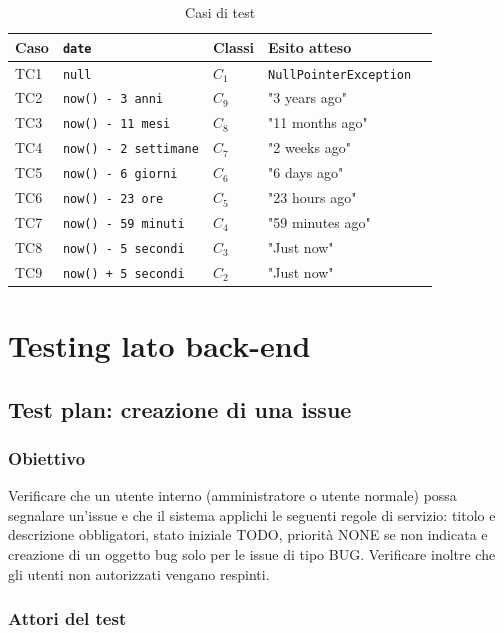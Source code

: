 \begin{table}[ht]
  \centering
  \small
  \caption{Casi di test}
  \label{tab:test-selecttogglefilter}
  \begin{tabular}{@{}llllp{4cm}@{}}
    \toprule
    Caso & \texttt{date} & Classi & Esito atteso \\
    \midrule
    TC1 & \texttt{null} & $C_1$ & \texttt{NullPointerException}  \\
    TC2 & \texttt{now() - 3 anni} & $C_9$ & "3 years ago" \\
    TC3 & \texttt{now() - 11 mesi}    & $C_8$ & "11 months ago" \\
    TC4 & \texttt{now() - 2 settimane}    & $C_7$ & "2 weeks ago"       \\
    TC5 & \texttt{now() - 6 giorni} & $C_6$ & "6 days ago"  \\
    TC6 & \texttt{now() - 23 ore} & $C_5$ & "23 hours ago" \\
    TC7 & \texttt{now() - 59 minuti}    & $C_4$ & "59 minutes ago" \\
    TC8 & \texttt{now() - 5 secondi}    & $C_3$ & "Just now"       \\
    TC9 & \texttt{now() + 5 secondi}    & $C_2$ & "Just now"       \\

    \bottomrule
  \end{tabular}
\end{table}

\section{Testing lato back-end}
\subsection{Test plan: creazione di una issue}

\subsubsection{Obiettivo} 

Verificare che un utente interno (amministratore o utente normale) possa 
segnalare un’issue e che il sistema applichi le seguenti regole di servizio: 
titolo e descrizione obbligatori, stato iniziale TODO, priorità NONE se non 
indicata e creazione di un oggetto bug solo per le issue di tipo BUG.  
Verificare inoltre che gli utenti non autorizzati vengano respinti. 

\subsubsection{Attori del test} 

